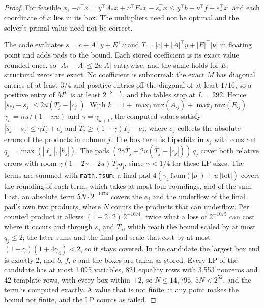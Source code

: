 \documentclass[11pt,a4paper]{article}
\begin{document}
\begin{proof}
For feasible $x$, $-c^\top x = y^\top A_\ast x + \nu^\top E_\ast x - s_\ast^\top x \le y^\top b + \nu^\top f -
s_\ast^\top x$, and each coordinate of $x$ lies in its box. The multipliers need not be optimal and the solver's primal
value need not be correct.

The code evaluates $s = c + A^\top y + E^\top\nu$ and $T = |c| + |A|^\top y + |E|^\top|\nu|$ in floating point and
adds pads to the bound. Each stored coefficient is its exact value rounded once, so $|A_\ast - A|\le 2u|A|$ entrywise, and the
same holds for $E$; structural zeros are exact. No coefficient is subnormal: the exact $M$ has diagonal entries of at
least $3/4$ and positive entries off the diagonal of at least $1/16$, so a positive entry of $M^L$ is at least
$2^{-8-L}$, and the tables stop at $L = 292$. Hence $|s_{\ast j} - s_j|\le 2u(T_j - |c_j|)$. With
$k = 1 + \max_j\mathrm{nnz}(A_{\cdot j}) + \max_j\mathrm{nnz}(E_{\cdot j})$, $\gamma_n = nu/(1-nu)$ and
$\gamma = \gamma_{k+1}$, the computed values satisfy $|\hat s_j - s_j|\le\gamma T_j + e_j$ and
$\hat T_j\ge(1-\gamma)T_j - e_j$, where $e_j$ collects the absolute errors of the products in column $j$. The box term is
Lipschitz in $s_j$ with constant $q_j = \max(|\ell_j|, |h_j|)$. The pads $(2\gamma\hat T_j + 2u(\hat T_j - |c_j|))\,q_j$
cover both relative errors with room $\gamma(1-2\gamma-2u)\,T_j q_j$, since $\gamma<1/4$ for these LP sizes. The terms
are summed with \texttt{math.fsum}; a final pad $4(\gamma_4\,\mathrm{fsum}(|p|) + u\,|\mathrm{tot}|)$ covers the
rounding of each term, which takes at most four roundings, and of the sum. Last, an absolute term $5N\cdot2^{-1074}$
covers the $e_j$ and the underflow of the final pad's own two products, where $N$ counts the products that can underflow.
Per counted product it allows $(1+2\cdot2)\,2^{-1074}$, twice what a loss of $2^{-1075}$ can cost where it occurs
and through $s_j$ and $T_j$, which reach the bound scaled by at most $q_j\le2$; the later sums and the final pad scale
that cost by at most $(1+\gamma)(1+4\gamma_4)<2$, so it stays covered.
In the candidate the largest box end is exactly 2,
and $b$, $f$, $c$ and the boxes are taken as stored. Every LP of the candidate has at most 1,095 variables, 821 equality rows with 3,553 nonzeros and 42 template rows, with
every box within $\pm2$, so $N\le14{,}795$, $5N<2^{52}$, and the term is computed exactly. A value that is not finite at
any point makes the bound not finite, and the LP counts as failed.
\end{proof}
\end{document}
